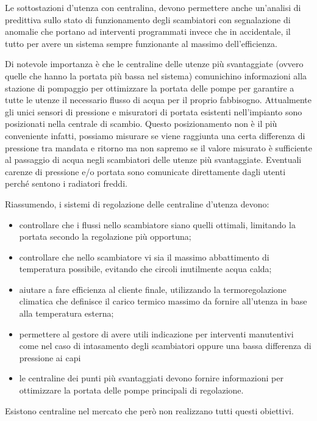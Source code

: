 \documentclass[laurea,oneside,11pt]{USiena_tesiLM}
\begin{document}
Le sottostazioni d'utenza con centralina, devono permettere anche un'analisi di predittiva sullo stato di funzionamento degli scambiatori con segnalazione di anomalie che portano ad interventi programmati invece che in accidentale, il tutto per avere un sistema sempre funzionante al massimo dell'efficienza.

Di notevole importanza è che le centraline delle utenze più svantaggiate (ovvero quelle che hanno la portata più bassa nel sistema) comunichino informazioni alla stazione di pompaggio per ottimizzare la portata delle pompe per garantire a tutte le utenze il necessario flusso di acqua per il proprio fabbisogno. Attualmente gli unici sensori di pressione e misuratori di portata esistenti nell'impianto sono posizionati nella centrale di scambio. Questo posizionamento non è il più conveniente infatti, possiamo misurare se viene raggiunta una certa differenza di pressione tra mandata e ritorno ma non sapremo se il valore misurato è sufficiente al passaggio di acqua negli scambiatori delle utenze più svantaggiate. Eventuali carenze di pressione e/o portata sono comunicate direttamente dagli utenti perché sentono i radiatori freddi.

Riassumendo, i sistemi di regolazione delle centraline d'utenza devono:
\begin{itemize}
\item controllare che i flussi nello scambiatore siano quelli ottimali, limitando la portata secondo la regolazione più opportuna;
\item controllare che nello scambiatore vi sia il massimo abbattimento di temperatura possibile, evitando che circoli inutilmente acqua calda;
\item aiutare a fare efficienza al cliente finale, utilizzando la termoregolazione climatica che definisce il carico termico massimo da fornire all'utenza in base alla temperatura esterna;
\item permettere al gestore di avere utili indicazione per interventi manutentivi come nel caso di intasamento degli scambiatori oppure una bassa differenza di pressione ai capi
\item le centraline dei punti più svantaggiati devono fornire informazioni per ottimizzare la portata delle pompe principali di regolazione.
\end{itemize}

Esistono centraline nel mercato che però non realizzano tutti questi obiettivi.
\end{document}
